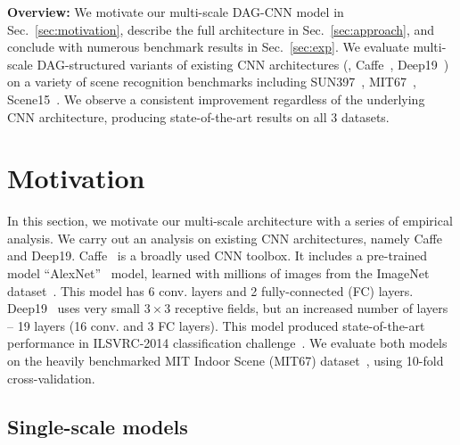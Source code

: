 \documentclass[10pt,twocolumn,letterpaper]{article}
\begin{document}
{\bf Overview:} We motivate our multi-scale DAG-CNN model in Sec.~\ref{sec:motivation}, describe the full architecture in Sec.~\ref{sec:approach}, and conclude with numerous benchmark results in Sec.~\ref{sec:exp}. We evaluate multi-scale DAG-structured variants of existing CNN architectures (\eg, Caffe~\cite{Caffe}, Deep19~\cite{veryDeep}) on a variety of scene recognition benchmarks including SUN397~\cite{SUN397}, MIT67~\cite{MIT67}, Scene15~\cite{Scene15}. We observe a consistent improvement regardless of the underlying CNN architecture, producing state-of-the-art results on all 3 datasets.



\section{Motivation\label{sec:motivation}}

In this section, we motivate our multi-scale architecture with a series of empirical analysis. We carry out an analysis on existing CNN architectures, namely Caffe and Deep19. Caffe~\cite{Caffe} is a broadly used CNN toolbox. It includes a pre-trained model ``AlexNet''~\cite{AlexNet} model, learned with millions of images from the ImageNet dataset~\cite{ImageNet}. This model has 6 conv. layers and 2 fully-connected (FC) layers. Deep19~\cite{veryDeep} uses very small $3\times 3$ receptive fields, but an increased number of layers -- 19 layers (16 conv. and 3 FC layers). This model produced state-of-the-art performance in ILSVRC-2014 classification challenge~\cite{ILSVRC14}. We evaluate both models on the heavily benchmarked MIT Indoor Scene (MIT67) dataset~\cite{MIT67}, using 10-fold cross-validation.

\subsection{Single-scale models} 
\end{document}
